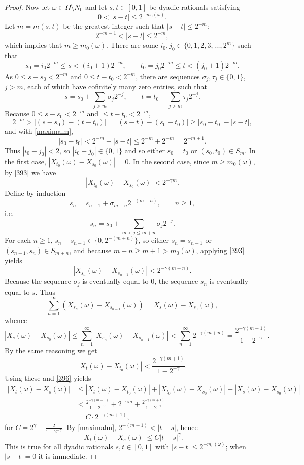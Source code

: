 \documentclass{article}
\theoremstyle{definition}
\theoremstyle{definition}
\begin{document}
\begin{proof}
Now let $\omega \in \Omega \setminus N_0$ and let $s,t \in [0,1]$ be dyadic rationals satisfying
\[
0<|s-t| \leq 2^{-m_0(\omega)}.
\]
Let $m=m(s,t)$ be the greatest integer  such that $|s-t| \leq 2^{-m}$:  
\begin{equation}
2^{-m-1} < |s-t| \leq 2^{-m},
\label{maximalm}
\end{equation}
which implies that $m \geq m_0(\omega)$.
There are some $i_0, j_0 \in \{0,1,2,3,\ldots,2^m\}$ such that 
\[
s_0 = i_0 2^{-m} \leq s < (i_0+1)2^{-m}, \qquad t_0= j_0 2^{-m} \leq t < (j_0+1)2^{-m}.
\]
As $0 \leq s-s_0 < 2^{-m}$ and $0 \leq t-t_0 < 2^{-m}$, there are 
sequences $\sigma_j, \tau_j \in \{0,1\}$, $j>m$, each of which have cofinitely many zero entries, such that
\[
s=s_0+\sum_{j > m} \sigma_j 2^{-j}, \qquad t=t_0+ \sum_{j > m} \tau_j 2^{-j}.
\]
Because $0\leq s-s_0<2^{-m}$ and $\leq t-t_0<2^{-m}$,
\[
2^{-m} > |(s-s_0)-(t-t_0)|
=|(s-t)-(s_0-t_0)|
\geq |s_0-t_0|-|s-t|,
\]
and with \eqref{maximalm},
\[
|s_0-t_0| < 2^{-m}+|s-t| \leq 2^{-m}+2^{-m} =2^{-m+1}.
\] 
Thus $|i_0-j_0| < 2$, so
$|i_0-j_0| \in \{0,1\}$ and so either
$s_0=t_0$ or $(s_0,t_0) \in S_m$. 
In the first case, $|X_{t_0}(\omega)-X_{s_0}(\omega)|=0$.
 In the second case, since $m \geq m_0(\omega)$,
by \eqref{393} we have
\begin{equation}
|X_{t_0}(\omega)-X_{s_0}(\omega)| < 2^{-\gamma m} .
\label{396}
\end{equation}
Define by induction
\[
s_n = s_{n-1}+\sigma_{m+n}2^{-(m+n)}, \qquad n \geq 1,
\]
i.e.
\[
s_n = s_0 + \sum_{m<j \leq m+n} \sigma_j 2^{-j}.
\]
For each $n \geq 1$,  $s_n-s_{n-1} \in \{0,2^{-(m+n)}\}$, so either
$s_n=s_{n-1}$ or $(s_{n-1},s_n) \in S_{m+n}$, and because
 $m+n \geq m+1>m_0(\omega)$, applying \eqref{393} yields
\[
|X_{s_n}(\omega)-X_{s_{n-1}}(\omega)| < 2^{-\gamma(m+n)}.
\]
Because the sequence $\sigma_j$ is eventually equal to $0$, the sequence $s_n$ is eventually equal to $s$.  Thus
\[
\sum_{n=1}^\infty (X_{s_n}(\omega)-X_{s_{n-1}}(\omega))
=X_s(\omega)-X_{s_0}(\omega),
\]
whence
\[
|X_s(\omega)-X_{s_0}(\omega)| \leq \sum_{n=1}^\infty |X_{s_n}(\omega)-X_{s_{n-1}}(\omega)|
<\sum_{n=1}^\infty 2^{-\gamma(m+n)}
=\frac{2^{-\gamma (m+1)}}{1-2^{-\gamma}}.
\]
By the same reasoning we get 
\[
|X_t(\omega)-X_{t_0}(\omega)| < \frac{2^{-\gamma (m+1)}}{1-2^{-\gamma}}.
\]
Using these and \eqref{396} yields
\begin{align*}
|X_t(\omega)-X_s(\omega)|&\leq |X_t(\omega)-X_{t_0}(\omega)|
+|X_{t_0}(\omega)-X_{s_0}(\omega)|+|X_s(\omega)-X_{s_0}(\omega)|\\
&<\frac{2^{-\gamma (m+1)}}{1-2^{-\gamma}}+2^{-\gamma m}+\frac{2^{-\gamma (m+1)}}{1-2^{-\gamma}}\\
&=C\cdot 2^{-\gamma(m+1)},
\end{align*}
for $C=2^\gamma+\frac{2}{1-2^{-\gamma}}$. 
By \eqref{maximalm}, $2^{-(m+1)}<|t-s|$,
hence
\begin{equation}
|X_t(\omega)-X_s(\omega)| \leq C |t-s|^\gamma.
\label{398}
\end{equation}
This is true for all dyadic rationals $s,t \in [0,1]$ with $|s-t| \leq 2^{-m_0(\omega)}$; when $|s-t|=0$ it is immediate.


\end{proof}
\end{document}
